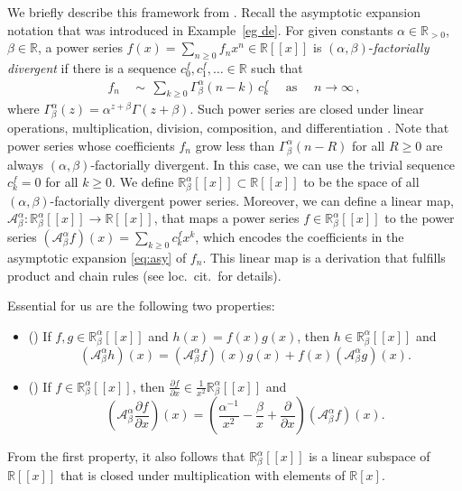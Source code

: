 \documentclass[oneside]{amsart}
\theoremstyle{definition}
\newcommand{\R}{{\mathbb{R}}}
\newcommand{\A}{{\mathcal{A}}}
\begin{document}
We briefly describe this framework from \cite{Bgenfun}.
Recall the asymptotic expansion notation that was introduced in Example~\ref{eg de}.
%
%
%
For given constants  $\alpha \in \R_{> 0}$, $\beta \in \R$,
a power series $f(x) = \sum_{n \geq 0} f_n x^n \in \R[[x]]$ is $(\alpha,\beta)$-\emph{factorially divergent} if there is a sequence $c_0^f,c_1^f,\ldots \in \R$ such that
\begin{align} \label{eq:asy} f_n &\,\sim\, \sum_{k\geq 0} \Gamma^{\alpha}_\beta(n-k) \,c_k^f \quad \text{ as } \quad n \rightarrow \infty\,, \end{align}
where $\Gamma^\alpha_\beta(z)= \alpha^{z+\beta} \Gamma(z+\beta)$. Such power series are closed under linear operations, multiplication, division, composition, and differentiation \cite{Bgenfun}. Note that power series whose coefficients $f_n$ grow less than $\Gamma^{\alpha}_\beta(n - R)$ for all $R \geq 0$ are always $(\alpha,\beta)$-factorially divergent. In this case, we can use the trivial sequence $c_k^f = 0$ for all $k \geq 0$. We define $\R^\alpha_\beta[[x]] \subset \R[[x]]$ to be the space of all $(\alpha,\beta)$-factorially divergent power series.
Moreover, we can define a linear map, $\A^\alpha_\beta: \R^\alpha_\beta[[x]] \rightarrow \R[[x]]$, that maps a power series $f \in \R^\alpha_\beta[[x]]$ to the power series $(\A^\alpha_\beta f)(x) =\sum_{k \geq 0} c_k^f x^k$, which encodes the coefficients in the asymptotic expansion \eqref{eq:asy} of $f_n$. This linear map is a derivation that fulfills product and chain rules (see loc.\ cit.\ for details).

Essential for us are the following two properties:
\begin{itemize}
\item[a] (\cite[Proposition 22]{Bgenfun})
If $f,g \in \R^\alpha_\beta[[x]]$ and $h(x) = f(x) g(x)$, then $h \in \R^\alpha_\beta[[x]]$ and 
$$(\A^\alpha_\beta h)(x) = (\A^\alpha_\beta f)(x) g(x) + f(x) (\A^\alpha_\beta g)(x).$$
\item[b]
(\cite[Proposition 15 and 38]{Bgenfun})
If $f \in \R^\alpha_\beta[[x]]$, then $\frac{\partial f}{\partial x} \in \frac{1}{x^2} \R^\alpha_\beta[[x]]$ and 
$$\left(\A^\alpha_\beta \frac{\partial f}{\partial x} \right)(x) = \left( \frac{\alpha^{-1}}{x^2} - \frac{\beta}{x} + \frac{\partial}{\partial x} \right) (\A^\alpha_\beta f)(x).$$
\end{itemize}
From the first property, it also follows that $\R^\alpha_\beta[[x]]$ is a linear subspace of $\R[[x]]$ that is closed under multiplication with elements of $\R[x]$.
\end{document}

